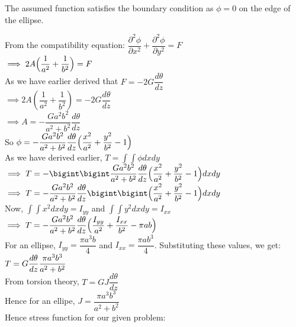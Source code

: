 \documentclass{article}
\begin{document}
\noindent The assumed function satisfies the boundary condition as $\phi=0$ on the edge of the ellipse. 

\noindent From the compatibility equation: $\dfrac{\partial^2 \phi}{\partial x^2}+ \dfrac{\partial^2 \phi}{\partial y^2}=F$ \\
$\implies 2A\Big{(}\dfrac{1}{a^2}+\dfrac{1}{b^2}\Big{)}=F$\\

\noindent As we have earlier derived that $F=-2G\dfrac{d\theta}{dz}$\\
$\implies 2A(\dfrac{1}{a^2}+\dfrac{1}{b^2})=-2G\dfrac{d\theta}{dz} $\\
$\implies A=- \dfrac{Ga^2b^2}{a^2+b^2}\dfrac{d\theta}{dz}$ \\

\noindent So $\phi=- \dfrac{Ga^2b^2}{a^2+b^2}\dfrac{d\theta}{dz}\Big{(}\dfrac{x^2}{a^2}+\dfrac{y^2}{b^2}-1\Big{)}$\\

\noindent As we have derived earlier, $T=\int\int\phi dxdy$\\
$\implies T=- \bigint\bigint \dfrac{Ga^2b^2}{a^2+b^2}\dfrac{d\theta}{dz}\Big{(}\dfrac{x^2}{a^2}+\dfrac{y^2}{b^2}-1\Big{)}dxdy$\\
$\implies T=-\dfrac{Ga^2b^2}{a^2+b^2}\dfrac{d\theta}{dz}\bigint\bigint\Big{(}\dfrac{x^2}{a^2}+\dfrac{y^2}{b^2}-1\Big{)}dxdy$\\

\noindent Now, $\int\int x^2dxdy= I_{yy}$ and $\int\int y^2dxdy= I_{xx}$ \\

\noindent $\implies T=-\dfrac{Ga^2b^2}{a^2+b^2}\dfrac{d\theta}{dz}\Big{(}\dfrac{I_{yy}}{a^2}+\dfrac{I_{xx}}{b^2}- \pi ab\Big{)}$\\

\noindent For an ellipse, $I_{yy}=\dfrac{\pi a^3b}{4}$ and $I_{xx}= \dfrac{\pi ab^3}{4}$. Substituting these values, we get: \\

$\noindent T=G\dfrac{d\theta}{dz}\dfrac{\pi a^3b^3}{a^2+b^2} $\\

\noindent From torsion theory, $T=GJ\dfrac{d\theta}{dz}$\\
Hence for an ellipe, $J=\dfrac{\pi a^3b^3}{a^2+b^2}$\\

\noindent Hence stress function for our given problem: \\
\end{document}
